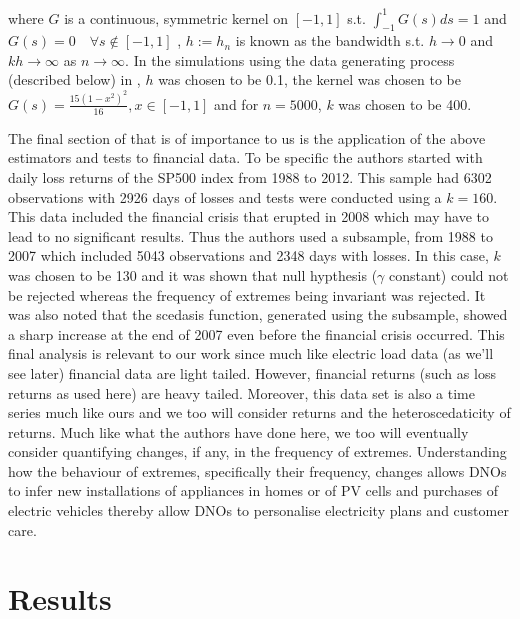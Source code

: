 \documentclass[a4paper]{article}
\begin{document}
\noindent where $G$ is a continuous, symmetric kernel on $[-1,1]$ s.t. $\int_{-1}^{1} G(s)ds = 1$ and $G(s) = 0 \quad \forall s \notin [-1,1]$ , $h := h_n$ is known as the bandwidth s.t. $h \rightarrow 0$ and $kh \rightarrow \infty$ as $n \rightarrow \infty$. In the simulations using the data generating process (described below) in \cite{einmahl16}, $h$ was chosen to be 0.1, the kernel was chosen to be $G(s) = \frac{15(1-x^2)^2}{16}, x \in [-1,1]$ and for $n=5000$, $k$ was chosen to be 400.

The final section of \cite{einmahl16} that is of importance to us is the application of the above estimators and tests to financial data. To be specific the authors started with daily loss returns of the SP500 index from 1988 to 2012. This sample had 6302 observations with 2926 days of losses and tests were conducted using a $k=160$. This data included the financial crisis that erupted in 2008 which may have to lead to no significant results. Thus the authors used a subsample, from 1988 to 2007 which included 5043 observations and 2348 days with losses. In this case, $k$ was chosen to be 130 and it was shown that null hypthesis ($\gamma$ constant) could not be rejected whereas the frequency of extremes being invariant was rejected.  It was also noted that the scedasis function, generated using the subsample, showed a sharp increase at the end of 2007 even before the financial crisis occurred. This final analysis is relevant to our work since much like electric load data (as we'll see later) financial data are light tailed. However, financial returns (such as loss returns as used here) are heavy tailed. Moreover, this data set is also a time series much like ours and we too will consider returns and the heteroscedaticity of returns. Much like what the authors have done here, we too will eventually consider quantifying changes, if any, in the frequency of extremes. Understanding how the behaviour of extremes, specifically their frequency, changes allows DNOs to infer new installations of appliances in homes or of PV cells and purchases of electric vehicles thereby allow DNOs to personalise electricity plans and customer care.

 
\clearpage


\section{Results}
\label{sec:results}
\end{document}
